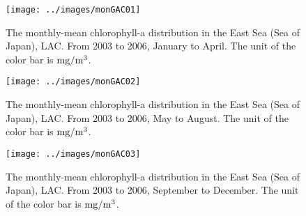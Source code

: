 \begin{figure}[h]
	\centering
	\texttt{[image: ../images/monGAC01]}\\
	\scriptsize\caption{The monthly-mean chlorophyll-a distribution in the East Sea (Sea of Japan), LAC. From 2003 to 2006, January to April. The unit of the color bar is $\rm mg/m^3$.}
	\label{fig:monGAC01}
\end{figure}


\begin{figure}[h]
	\centering
	\texttt{[image: ../images/monGAC02]}\\
	\scriptsize\caption{The monthly-mean chlorophyll-a distribution in the East Sea (Sea of Japan), LAC. From 2003 to 2006, May to August. The unit of the color bar is $\rm mg/m^3$.}
	\label{fig:monGAC02}
\end{figure}


\begin{figure}[h]
	\centering
	\texttt{[image: ../images/monGAC03]}\\
	\scriptsize\caption{The monthly-mean chlorophyll-a distribution in the East Sea (Sea of Japan), LAC. From 2003 to 2006, September to December. The unit of the color bar is $\rm mg/m^3$.}
	\label{fig:monGAC03}
\end{figure}


